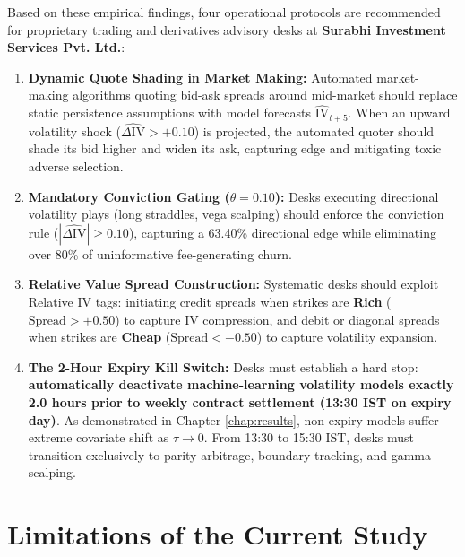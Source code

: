 Based on these empirical findings, four operational protocols are recommended for proprietary trading and derivatives advisory desks at \textbf{Surabhi Investment Services Pvt. Ltd.}:

\begin{enumerate}\setlength{\itemsep}{2pt}\setlength{\parskip}{0pt}
    \item \textbf{Dynamic Quote Shading in Market Making:} Automated market-making algorithms quoting bid-ask spreads around mid-market should replace static persistence assumptions with model forecasts $\widehat{\text{IV}}_{t+5}$. When an upward volatility shock ($\widehat{\Delta \text{IV}} > +0.10$) is projected, the automated quoter should shade its bid higher and widen its ask, capturing edge and mitigating toxic adverse selection.
    \item \textbf{Mandatory Conviction Gating ($\theta = 0.10$):} Desks executing directional volatility plays (long straddles, vega scalping) should enforce the conviction rule ($|\widehat{\Delta \text{IV}}| \ge 0.10$), capturing a 63.40\% directional edge while eliminating over 80\% of uninformative fee-generating churn.
    \item \textbf{Relative Value Spread Construction:} Systematic desks should exploit Relative IV tags: initiating credit spreads when strikes are \textbf{Rich} ($\text{Spread} > +0.50$) to capture IV compression, and debit or diagonal spreads when strikes are \textbf{Cheap} ($\text{Spread} < -0.50$) to capture volatility expansion.
    \item \textbf{The 2-Hour Expiry Kill Switch:} Desks must establish a hard stop: \textbf{automatically deactivate machine-learning volatility models exactly 2.0 hours prior to weekly contract settlement (13:30 IST on expiry day)}. As demonstrated in Chapter \ref{chap:results}, non-expiry models suffer extreme covariate shift as $\tau \to 0$. From 13:30 to 15:30 IST, desks must transition exclusively to parity arbitrage, boundary tracking, and gamma-scalping.
\end{enumerate}

\section{Limitations of the Current Study}
\label{sec:limitations}

